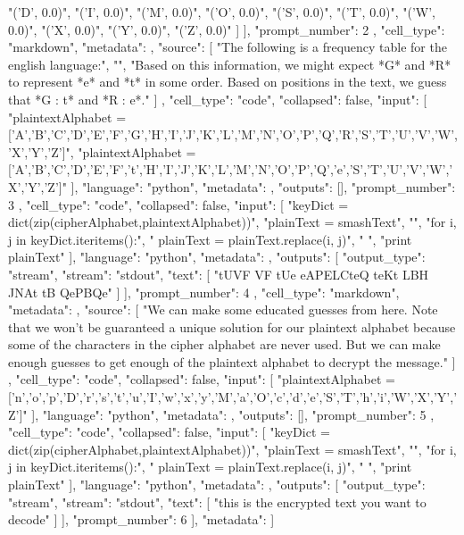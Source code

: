 \documentclass[handout]{ximera}
\begin{document}
\begin{python}
{{{{        "('D', 0.0)\n",
        "('I', 0.0)\n",
        "('M', 0.0)\n",
        "('O', 0.0)\n",
        "('S', 0.0)\n",
        "('T', 0.0)\n",
        "('W', 0.0)\n",
        "('X', 0.0)\n",
        "('Y', 0.0)\n",
        "('Z', 0.0)\n"
       ]
      }
     ],
     "prompt_number": 2
    },
    {
     "cell_type": "markdown",
     "metadata": {},
     "source": [
      "The following is a frequency table for the english language:\n",
      "\n",
      "Based on this information, we might expect *G* and *R* to represent *e* and *t* in some order.  Based on positions in the text, we guess that *G : t* and *R : e*."
     ]
    },
    {
     "cell_type": "code",
     "collapsed": false,
     "input": [
      "plaintextAlphabet = ['A','B','C','D','E','F','G','H','I','J','K','L','M','N','O','P','Q','R','S','T','U','V','W','X','Y','Z']\n",
      "plaintextAlphabet = ['A','B','C','D','E','F','t','H','I','J','K','L','M','N','O','P','Q','e','S','T','U','V','W','X','Y','Z']"
     ],
     "language": "python",
     "metadata": {},
     "outputs": [],
     "prompt_number": 3
    },
    {
     "cell_type": "code",
     "collapsed": false,
     "input": [
      "keyDict = dict(zip(cipherAlphabet,plaintextAlphabet))\n",
      "plainText = smashText\n",
      "\n",
      "for i, j in keyDict.iteritems():\n",
      "    plainText = plainText.replace(i, j)\n",
      "    \n",
      "print plainText"
     ],
     "language": "python",
     "metadata": {},
     "outputs": [
      {
       "output_type": "stream",
       "stream": "stdout",
       "text": [
        "tUVF VF tUe eAPELCteQ teKt LBH JNAt tB QePBQe\n"
       ]
      }
     ],
     "prompt_number": 4
    },
    {
     "cell_type": "markdown",
     "metadata": {},
     "source": [
      "We can make some educated guesses from here. Note that we won't be guaranteed a unique solution for our plaintext alphabet because some of the characters in the cipher alphabet are never used.  But we can make enough guesses to get enough of the plaintext alphabet to decrypt the message."
     ]
    },
    {
     "cell_type": "code",
     "collapsed": false,
     "input": [
      "plaintextAlphabet = ['n','o','p','D','r','s','t','u','I','w','x','y','M','a','O','c','d','e','S','T','h','i','W','X','Y','Z']"
     ],
     "language": "python",
     "metadata": {},
     "outputs": [],
     "prompt_number": 5
    },
    {
     "cell_type": "code",
     "collapsed": false,
     "input": [
      "keyDict = dict(zip(cipherAlphabet,plaintextAlphabet))\n",
      "plainText = smashText\n",
      "\n",
      "for i, j in keyDict.iteritems():\n",
      "    plainText = plainText.replace(i, j)\n",
      "    \n",
      "print plainText"
     ],
     "language": "python",
     "metadata": {},
     "outputs": [
      {
       "output_type": "stream",
       "stream": "stdout",
       "text": [
        "this is the encrypted text you want to decode\n"
       ]
      }
     ],
     "prompt_number": 6
    }
   ],
   "metadata": {}
  }
 ]
}
\end{python}
\end{document}
